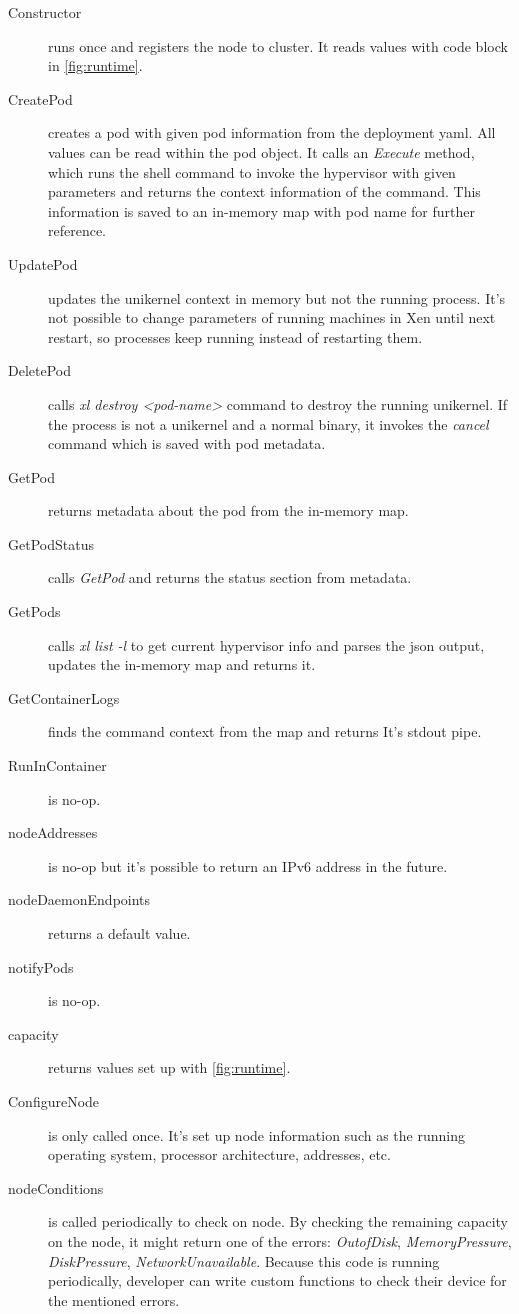 \begin{description}
  \item  [Constructor] runs once and registers the node to cluster. It reads values with code block in \ref{fig:runtime}.
  \item [CreatePod] creates a pod with given pod information from the deployment yaml. All values can be read within the pod object. It calls an \textit{Execute} method, which runs the shell command to invoke the hypervisor with given parameters and returns the context information of the command. This information is saved to an in-memory map with pod name for further reference.
  \item [UpdatePod] updates the unikernel context in memory but not the running process. It's not possible to change parameters of running machines in Xen until next restart, so processes keep running instead of restarting them.
  \item [DeletePod] calls \textit{xl destroy <pod-name>} command to destroy the running unikernel. If the process is not a unikernel and a normal binary, it invokes the \textit{cancel} command which is saved with pod metadata.
  \item [GetPod] returns metadata about the pod from the in-memory map.
  \item [GetPodStatus] calls \textit{GetPod} and returns the status section from metadata.
  \item [GetPods] calls \textit{xl list -l} to get current hypervisor info and parses the json output, updates the in-memory map and returns it.
  \item [GetContainerLogs] finds the command context from the map and returns It's stdout pipe.
  \item [RunInContainer] is no-op.
  \item [nodeAddresses] is no-op but it's possible to return an IPv6 address in the future.
  \item [nodeDaemonEndpoints] returns a default value.
  \item [notifyPods] is no-op.
  \item [capacity] returns values set up with \ref{fig:runtime}.
  \item [ConfigureNode] is only called once. It's set up node information such as the running operating system, processor architecture, addresses, etc.
  \item [nodeConditions] is called periodically to check on node. By checking the remaining capacity on the node, it might return one of the errors: \textit{OutofDisk}, \textit{MemoryPressure}, \textit{DiskPressure}, \textit{NetworkUnavailable}. Because this code is running periodically, developer can write custom functions to check their device for the mentioned errors.
  \end{description}
